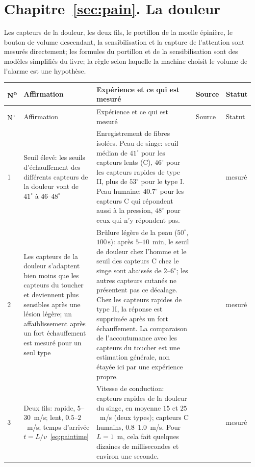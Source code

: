 \section{Chapitre~\ref{sec:pain}. La douleur}

Les capteurs de la douleur, les deux fils, le portillon de la moelle épinière, le bouton de volume descendant, la sensibilisation et la capture de l'attention sont mesurés directement; les formules du portillon et de la sensibilisation sont des modèles simplifiés du livre; la règle selon laquelle la machine choisit le volume de l'alarme est une hypothèse.

{\footnotesize
\setlength{\tabcolsep}{3pt}\renewcommand{\arraystretch}{1.15}
\begin{longtable}{>{\raggedright}p{0.5cm}>{\raggedright}p{4.0cm}>{\raggedright}p{5.6cm}>{\raggedright}p{2.3cm}>{\raggedright\arraybackslash}p{1.7cm}}
\toprule
N\textsuperscript{o} & Affirmation & Expérience et ce qui est mesuré & Source & Statut \\
\midrule\endfirsthead
\toprule
N\textsuperscript{o} & Affirmation & Expérience et ce qui est mesuré & Source & Statut \\
\midrule\endhead
1 & Seuil élevé: les seuils d'échauffement des différents capteurs de la douleur vont de $41^\circ$ à $46$--$48^\circ$ & Enregistrement de fibres isolées. Peau de singe: seuil médian de $41^\circ$ pour les capteurs lents (C), $46^\circ$ pour les capteurs rapides de type II, plus de $53^\circ$ pour le type I. Peau humaine: $40.7^\circ$ pour les capteurs C qui répondent aussi à la pression, $48^\circ$ pour ceux qui n'y répondent pas. & \cite{Treede1995heat, Weidner1999cfib} & mesuré \\
2 & Les capteurs de la douleur s'adaptent bien moins que les capteurs du toucher et deviennent plus sensibles après une lésion légère; un affaiblissement après un fort échauffement est mesuré pour un seul type & Brûlure légère de la peau ($50^\circ$, $100\,\text{s}$): après $5$--$10$~min, le seuil de douleur chez l'homme et le seuil des capteurs C chez le singe sont abaissés de $2$--$6^\circ$; les autres capteurs cutanés ne présentent pas ce décalage. Chez les capteurs rapides de type II, la réponse est supprimée après un fort échauffement. La comparaison de l'accoutumance avec les capteurs du toucher est une estimation générale, non étayée ici par une expérience propre. & \cite{LaMotte1982hyper, Treede1995heat} & mesuré \\
3 & Deux fils: rapide, $5$--$30$~m/s; lent, $0.5$--$2$~m/s; temps d'arrivée $t=L/v$~\eqref{eq:paintime} & Vitesse de conduction: capteurs rapides de la douleur du singe, en moyenne $15$ et $25$~m/s (deux types); capteurs C humains, $0.8$--$1.0$~m/s. Pour $L=1$~m, cela fait quelques dizaines de millisecondes et environ une seconde. & \cite{Treede1995heat, Weidner1999cfib} & mesuré \\

\end{longtable}}
